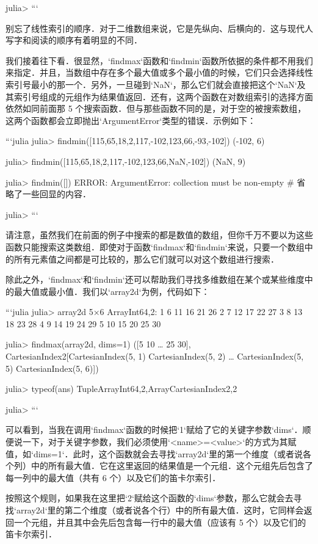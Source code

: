 julia> 
```

别忘了线性索引的顺序．对于二维数组来说，它是先纵向、后横向的．这与现代人写字和阅读的顺序有着明显的不同．

我们接着往下看．很显然，`findmax`函数和`findmin`函数所依据的条件都不用我们来指定．并且，当数组中存在多个最大值或多个最小值的时候，它们只会选择线性索引号最小的那一个．另外，一旦碰到`NaN`，那么它们就会直接把这个`NaN`及其索引号组成的元组作为结果值返回．还有，这两个函数在对数组索引的选择方面依然如同前面那 5 个搜索函数．但与那些函数不同的是，对于空的被搜索数组，这两个函数都会立即抛出`ArgumentError`类型的错误．示例如下：

```julia
julia> findmin([115,65,18,2,117,-102,123,66,-93,-102])
(-102, 6)

julia> findmin([115,65,18,2,117,-102,123,66,NaN,-102])
(NaN, 9)

julia> findmin([])
ERROR: ArgumentError: collection must be non-empty
# 省略了一些回显的内容．

julia> 
```

请注意，虽然我们在前面的例子中搜索的都是数值的数组，但你千万不要以为这些函数只能搜索这类数组．即使对于函数`findmax`和`findmin`来说，只要一个数组中的所有元素值之间都是可比较的，那么它们就可以对这个数组进行搜索．

除此之外，`findmax`和`findmin`还可以帮助我们寻找多维数组在某个或某些维度中的最大值或最小值．我们以`array2d`为例，代码如下：

```julia
julia> array2d
5×6 Array{Int64,2}:
 1   6  11  16  21  26
 2   7  12  17  22  27
 3   8  13  18  23  28
 4   9  14  19  24  29
 5  10  15  20  25  30

julia> findmax(array2d, dims=1)
([5 10 … 25 30], CartesianIndex{2}[CartesianIndex(5, 1) CartesianIndex(5, 2) … CartesianIndex(5, 5) CartesianIndex(5, 6)])

julia> typeof(ans)
Tuple{Array{Int64,2},Array{CartesianIndex{2},2}}

julia> 
```

可以看到，当我在调用`findmax`函数的时候把`1`赋给了它的关键字参数`dims`．顺便说一下，对于关键字参数，我们必须使用`<name>=<value>`的方式为其赋值，如`dims=1`．此时，这个函数就会去寻找`array2d`里的第一个维度（或者说各个列）中的所有最大值．它在这里返回的结果值是一个元组．这个元组先后包含了每一列中的最大值（共有 6 个）以及它们的笛卡尔索引．

按照这个规则，如果我在这里把`2`赋给这个函数的`dims`参数，那么它就会去寻找`array2d`里的第二个维度（或者说各个行）中的所有最大值．这时，它同样会返回一个元组，并且其中会先后包含每一行中的最大值（应该有 5 个）以及它们的笛卡尔索引．

